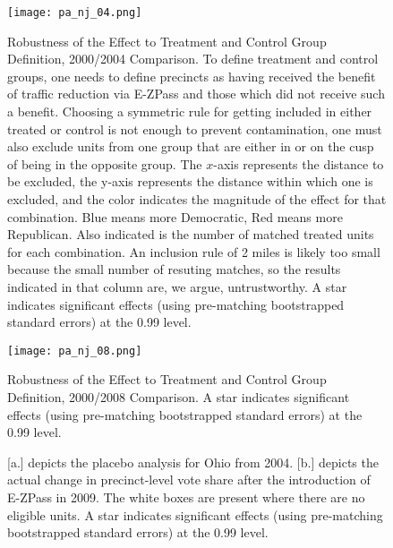\documentclass[11.0pt]{article}
\theoremstyle{definition}
\begin{document}
\begin{figure}[htb!]
\begin{center}
\texttt{[image: pa\_nj\_04.png]}
\caption{Robustness of the Effect to Treatment and Control Group Definition, 2000/2004 Comparison. To define treatment and control groups, one needs to define precincts as having received the benefit of traffic reduction via E-ZPass and those which did not receive such a benefit. Choosing a symmetric rule for getting included in either treated or control is not enough to prevent contamination, one must also exclude units from one group that are  either in or on the cusp of being in the opposite group.  The $x$-axis represents the distance to be excluded, the y-axis represents the distance within which one is excluded, and the color indicates the magnitude of the effect for that combination. Blue means more Democratic, Red means more Republican.  Also indicated is the number of matched treated units for each combination. An inclusion rule of 2 miles is likely too small because the small number of resuting matches, so the results indicated in that column are, we argue, untrustworthy. A star indicates significant effects (using pre-matching bootstrapped standard errors) at the 0.99 level.} 
\label{colorgram_04}
\end{center}
\end{figure}

\begin{figure}[htb!]
\begin{center}
\texttt{[image: pa\_nj\_08.png]}
\caption{Robustness of the Effect to Treatment and Control Group Definition, 2000/2008 Comparison. A star indicates significant effects (using pre-matching bootstrapped standard errors) at the 0.99 level.} 
\label{colorgram_08}
\end{center}
\end{figure}

\begin{figure}[htb!]%
    \centering
    \quad
   \caption{[a.] depicts the placebo analysis for Ohio from 2004. [b.] depicts the actual change in precinct-level vote share after the introduction of E-ZPass in 2009. The white boxes are present where there are no eligible units. A star indicates significant effects (using pre-matching bootstrapped standard errors) at the 0.99 level.}
   \label{ohio}
\end{figure}
\end{document}
